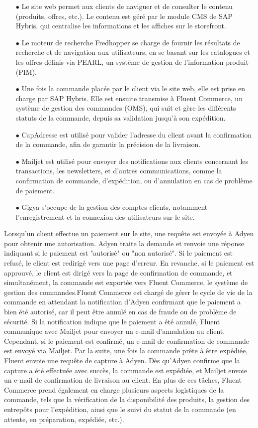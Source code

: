 \begin{itemize}
    \item [$\bullet$]Le site web permet aux clients de naviguer et de consulter le contenu (produits, offres, etc.). Le contenu est géré par le module CMS de SAP Hybris, qui centralise les informations et les affiches sur le storefront.
    \item [$\bullet$]Le moteur de recherche Fredhopper se charge de fournir les résultats de recherche et de navigation aux utilisateurs, en se basant sur les catalogues et les offres définis via PEARL, un système de gestion de l'information produit (PIM).
    \item [$\bullet$]Une fois la commande placée par le client via le site web, elle est prise en charge par SAP Hybris. Elle est ensuite transmise à Fluent Commerce, un système de gestion des commandes (OMS), qui suit et gère les différents statuts de la commande, depuis sa validation jusqu’à son expédition.
    \item [$\bullet$]CapAdresse est utilisé pour valider l’adresse du client avant la confirmation de la commande, afin de garantir la précision de la livraison.
    \item [$\bullet$]Mailjet est utilisé pour envoyer des notifications aux clients concernant les transactions, les newsletters, et d'autres communications, comme la confirmation de commande, d’expédition, ou d’annulation en cas de problème de paiement.
    \item [$\bullet$]Gigya s’occupe de la gestion des comptes clients, notamment l’enregistrement et la connexion des utilisateurs sur le site.
\end{itemize}
Lorsqu'un client effectue un paiement sur le site, une requête est envoyée à Adyen pour obtenir une autorisation. Adyen traite la demande et renvoie une réponse indiquant si le paiement est "autorisé" ou "non autorisé". Si le paiement est refusé, le client est redirigé vers une page d'erreur. En revanche, si le paiement est approuvé, le client est dirigé vers la page de confirmation de commande, et simultanément, la commande est exportée vers Fluent Commerce, le système de gestion des commandes.Fluent Commerce est chargé de gérer le cycle de vie de la commande en attendant la notification d'Adyen confirmant que le paiement a bien été autorisé, car il peut être annulé en cas de fraude ou de problème de sécurité. Si la notification indique que le paiement a été annulé, Fluent communique avec Mailjet pour envoyer un e-mail d'annulation au client. Cependant, si le paiement est confirmé, un e-mail de confirmation de commande est envoyé via Mailjet. Par la suite, une fois la commande prête à être expédiée, Fluent envoie une requête de capture à Adyen. Dès qu'Adyen confirme que la capture a été effectuée avec succès, la commande est expédiée, et Mailjet envoie un e-mail de confirmation de livraison au client. En plus de ces tâches, Fluent Commerce prend également en charge plusieurs aspects logistiques de la commande, tels que la vérification de la disponibilité des produits, la gestion des entrepôts pour l’expédition, ainsi que le suivi du statut de la commande (en attente, en préparation, expédiée, etc.).

